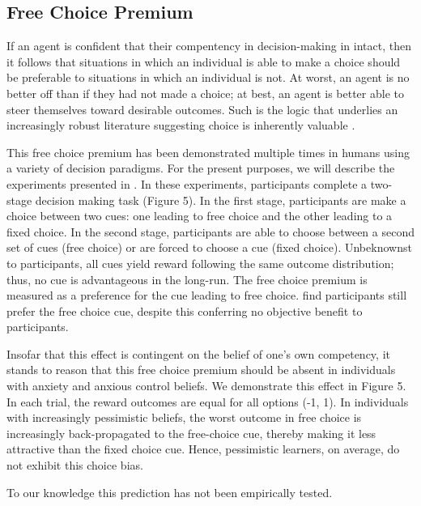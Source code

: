 \documentclass[11pt]{article} %
\begin{document}
\subsection{Free Choice Premium}

If an agent is confident that their compentency in decision-making in intact,
then it follows that situations in which an individual is able to make a choice
should be preferable to situations in which an individual is not. At worst,
an agent is no better off than if they had not made a choice; at best, an agent
is better able to steer themselves toward desirable outcomes. Such is the logic
that underlies an increasingly robust literature suggesting choice is inherently
valuable \citep{Leotti2010}.

This free choice premium has been demonstrated multiple times in humans \citep{Suzuki1997,Leotti2011,Leotti2014,Cockburn2014} using a variety of decision
paradigms. For the present purposes, we will describe the experiments presented in
\citep{Leotti2011,Leotti2014}. In these experiments, participants complete a
two-stage decision making task (Figure 5). In the first stage, participants are
make a choice between two cues: one leading to free choice and the other leading
to a fixed choice. In the second stage, participants are able to choose between
a second set of cues (free choice) or are forced to choose a cue (fixed choice).
Unbeknownst to participants, all cues yield reward following the same outcome
distribution; thus, no cue is advantageous in the long-run. The free choice
premium is measured as a preference for the cue leading to free choice. \cite{Leotti2011,Leotti2014}
find participants still prefer the free choice cue, despite this conferring no
objective benefit to participants.

Insofar that this effect is contingent on the belief of one's own competency,
it stands to reason that this free choice premium should be absent in individuals
with anxiety and anxious control beliefs. We demonstrate this effect in Figure 5.
In each trial, the reward outcomes are equal for all options (-1, 1). In individuals
with increasingly pessimistic beliefs, the worst outcome in free choice is increasingly
back-propagated to the free-choice cue, thereby making it less attractive than
the fixed choice cue. Hence, pessimistic learners, on average, do not exhibit
this choice bias.

To our knowledge this prediction has not been empirically tested.
\end{document}
